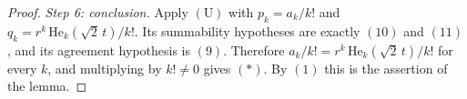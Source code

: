 \begin{proof}
\emph{Step 6: conclusion.}
Apply $(\mathrm{U})$ with $p_k = a_k/k!$ and $q_k = r^k\,\mathrm{He}_k(\sqrt2\,t)/k!$.
Its summability hypotheses are exactly $(10)$ and $(11)$, and its agreement
hypothesis is $(9)$.  Therefore $a_k/k! = r^k\,\mathrm{He}_k(\sqrt2\,t)/k!$ for
every $k$, and multiplying by $k! \neq 0$ gives $(\ast)$.  By $(1)$ this is the
assertion of the lemma.
\end{proof}
